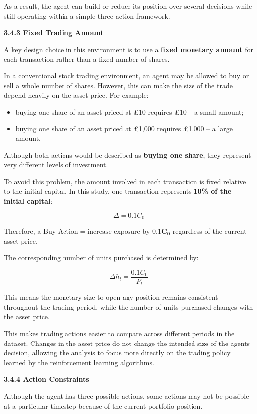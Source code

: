 As a result, the agent can build or reduce its position over several
decisions while still operating within a simple three-action framework.

\textbf{3.4.3 Fixed Trading Amount}

A key design choice in this environment is to use a \textbf{fixed
monetary amount} for each transaction rather than a fixed number of
shares.

In a conventional stock trading environment, an agent may be allowed to
buy or sell a whole number of shares. However, this can make the size of
the trade depend heavily on the asset price. For example:

\begin{itemize}
\item
  buying one share of an asset priced at £10 requires £10 -- a small
  amount;
\item
  buying one share of an asset priced at £1,000 requires £1,000 -- a
  large amount.
\end{itemize}

Although both actions would be described as \textbf{buying one share},
they represent very different levels of investment.

To avoid this problem, the amount involved in each transaction is fixed
relative to the initial capital. In this study, one transaction
represents \textbf{10\% of the initial capital}:

\[\Delta = 0.1C_{0}\]

Therefore, a
\(\text{Buy Action}\mathbf{=}\text{increase~exposure~by~}\mathbf{0.1}\mathbf{C}_{\mathbf{0}}\)
regardless of the current asset price.

The corresponding number of units purchased is determined by:

\[\Delta h_{t} = \frac{0.1C_{0}}{P_{t}}\]

This means the monetary size to open any position remains consistent
throughout the trading period, while the number of units purchased
changes with the asset price.

This makes trading actions easier to compare across different periods in
the dataset. Changes in the asset price do not change the intended size
of the agent\textquotesingle s decision, allowing the analysis to focus
more directly on the trading policy learned by the reinforcement
learning algorithms.

\textbf{3.4.4 Action Constraints}

Although the agent has three possible actions, some actions may not be
possible at a particular timestep because of the current portfolio
position.

